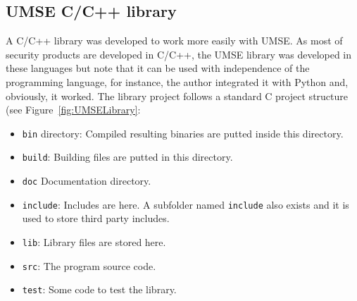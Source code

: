 \subsection{UMSE C/C++ library}
A C/C++ library was developed to work more easily with UMSE. As most of
security products are developed in C/C++, the UMSE library was developed in
these languages but note that it can be used with independence of the
programming language, for instance, the author integrated it with Python and,
obviously, it worked. The library project follows a standard C project
structure\cite{CanonicalProjectStructure} (see Figure~\ref{fig:UMSELibrary}:
\begin{itemize}
\item \texttt{bin} directory: Compiled resulting binaries are putted inside
  this directory.
\item \texttt{build}: Building files are putted in this directory.
\item \texttt{doc} Documentation directory.
\item \texttt{include}: Includes are here. A subfolder named \texttt{include}
  also exists and it is used to store third party includes.
\item \texttt{lib}: Library files are stored here.
\item \texttt{src}: The program source code.
\item \texttt{test}: Some code to test the library.
\end{itemize}

